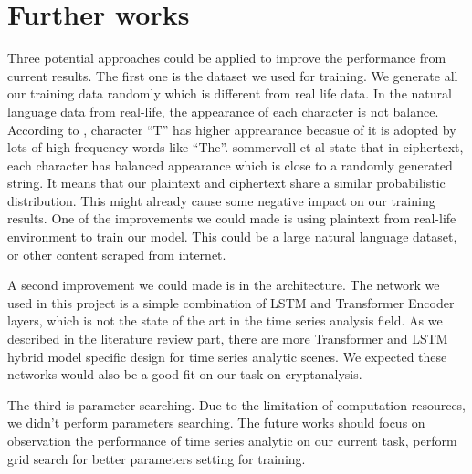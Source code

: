 \section{Further works}
Three potential approaches could be applied to improve the performance from current results. The first one is the dataset we used for training. We generate all our training data randomly which is different from real life data. In the natural language data from real-life, the appearance of each character is not balance. According to \cite{heise1965semantic}, character “T” has higher apprearance becasue of it is adopted by lots of high frequency words like “The”. sommervoll et al \cite{sommervoll2021genetic} state that in ciphertext, each character has balanced appearance which is close to a randomly generated string. It means that our plaintext and ciphertext share a similar probabilistic distribution. This might already cause some negative impact on our training results. One of the improvements we could made is using plaintext from real-life environment to train our model. This could be a large natural language dataset, or other content scraped from internet.

A second improvement we could made is in the architecture. The network we used in this project is a simple combination of LSTM and Transformer Encoder layers, which is not the state of the art in the time series analysis field. As we described in the literature review part, there are more Transformer and LSTM hybrid model specific design for time series analytic scenes. We expected these networks would also be a good fit on our task on cryptanalysis. 

The third is parameter searching. Due to the limitation of computation resources, we didn’t perform parameters searching. The future works should focus on observation the performance of time series analytic on our current task, perform grid search for better parameters setting for training. 

